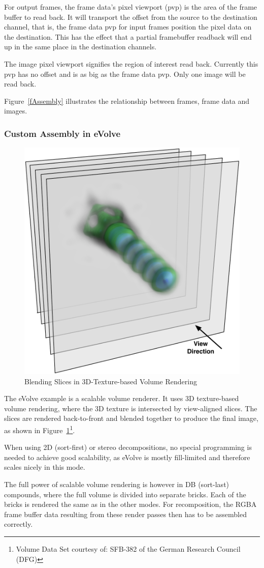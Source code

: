 \documentclass[10pt,a4]{scrartcl}
\newcommand{\fig}[1]{Figure~\ref{#1}}
\begin{document}
For output frames, the frame data's pixel viewport (pvp) is the area of
the frame buffer to read back. It will transport the offset from the
source to the destination channel, that is, the frame data pvp for input
frames position the pixel data on the destination. This has the effect
that a partial framebuffer readback will end up in the same place in the
destination channels.

The image pixel viewport signifies the region of interest read
back. Currently this pvp has no offset and is as big as the frame data
pvp. Only one image will be read back.

\fig{fAssembly} illustrates the relationship between frames, frame data
and images.

\subsubsection{Custom Assembly in eVolve}

\begin{figure}
  \includegraphics[width=.4\textwidth]{images/slices.pdf}
  {\caption{\small\label{fSlices}Blending Slices in 3D-Texture-based
      Volume Rendering}}
\end{figure}
The \textsf{eVolve} example is a scalable volume renderer. It uses 3D
texture-based volume rendering, where the 3D texture is intersected by
view-aligned slices. The slices are rendered back-to-front and blended
together to produce the final image, as shown in
\fig{fSlices}\footnote{Volume Data Set courtesy of: SFB-382 of the German
  Research Council (DFG)}.

When using 2D (sort-first) or stereo decompositions, no special
programming is needed to achieve good scalability, as \textsf{eVolve} is
mostly fill-limited and therefore scales nicely in this mode. 

The full power of scalable volume rendering is however in DB (sort-last)
compounds, where the full volume is divided into separate bricks. Each
of the bricks is rendered the same as in the other modes. For
recomposition, the \textsf{RGBA} frame buffer data resulting from these
render passes then has to be assembled correctly.
\end{document}
